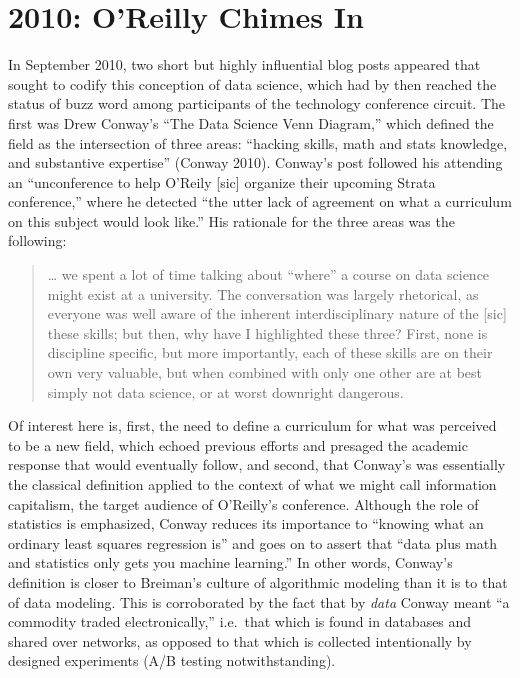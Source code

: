 \documentclass[
  letterpaper,
]{report}
\begin{document}
\hypertarget{oreilly-chimes-in}{%
\section{2010: O'Reilly Chimes In}\label{oreilly-chimes-in}}

In September 2010, two short but highly influential blog posts appeared
that sought to codify this conception of data science, which had by then
reached the status of buzz word among participants of the technology
conference circuit. The first was Drew Conway's ``The Data Science Venn
Diagram,'' which defined the field as the intersection of three areas:
``hacking skills, math and stats knowledge, and substantive expertise''
(Conway 2010). Conway's post followed his attending an ``unconference to
help O'Reily {[}sic{]} organize their upcoming Strata conference,''
where he detected ``the utter lack of agreement on what a curriculum on
this subject would look like.'' His rationale for the three areas was
the following:

\begin{quote}
\ldots{} we spent a lot of time talking about ``where'' a course on data
science might exist at a university. The conversation was largely
rhetorical, as everyone was well aware of the inherent interdisciplinary
nature of the {[}sic{]} these skills; but then, why have I highlighted
these three? First, none is discipline specific, but more importantly,
each of these skills are on their own very valuable, but when combined
with only one other are at best simply not data science, or at worst
downright dangerous.
\end{quote}

Of interest here is, first, the need to define a curriculum for what was
perceived to be a new field, which echoed previous efforts and presaged
the academic response that would eventually follow, and second, that
Conway's was essentially the classical definition applied to the context
of what we might call information capitalism, the target audience of
O'Reilly's conference. Although the role of statistics is emphasized,
Conway reduces its importance to ``knowing what an ordinary least
squares regression is'' and goes on to assert that ``data plus math and
statistics only gets you machine learning.'' In other words, Conway's
definition is closer to Breiman's culture of algorithmic modeling than
it is to that of data modeling. This is corroborated by the fact that by
\emph{data} Conway meant ``a commodity traded electronically,''
i.e.~that which is found in databases and shared over networks, as
opposed to that which is collected intentionally by designed experiments
(A/B testing notwithstanding).
\end{document}
